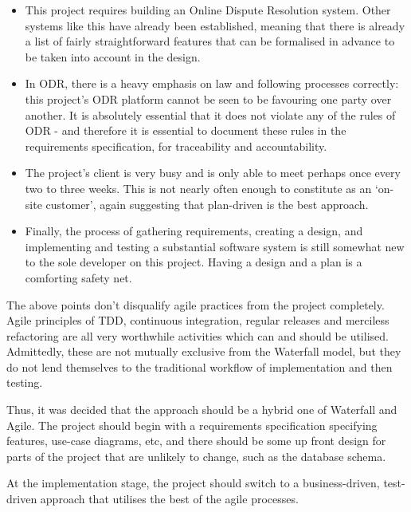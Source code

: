 \begin{itemize}

    \item This project requires building an Online Dispute Resolution system. Other systems like this have already been established, meaning that there is already a list of fairly straightforward features that can be formalised in advance to be taken into account in the design.
    
    \item In ODR, there is a heavy emphasis on law and following processes correctly: this project's ODR platform cannot be seen to be favouring one party over another. It is absolutely essential that it does not violate any of the rules of ODR - and therefore it is essential to document these rules in the requirements specification, for traceability and accountability.
    
    \item The project's client is very busy and is only able to meet perhaps once every two to three weeks. This is not nearly often enough to constitute as an `on-site customer', again suggesting that plan-driven is the best approach.
    
    \item Finally, the process of gathering requirements, creating a design, and implementing and testing a substantial software system is still somewhat new to the sole developer on this project. Having a design and a plan is a comforting safety net.

\end{itemize}

The above points don't disqualify agile practices from the project completely. Agile principles of TDD, continuous integration, regular releases and merciless refactoring are all very worthwhile activities which can and should be utilised. Admittedly, these are not mutually exclusive from the Waterfall model, but they do not lend themselves to the traditional workflow of implementation and then testing.

Thus, it was decided that the approach should be a hybrid one of Waterfall and Agile. The project should begin with a requirements specification specifying features, use-case diagrams, etc, and there should be some up front design for parts of the project that are unlikely to change, such as the database schema.

At the implementation stage, the project should switch to a business-driven, test-driven approach that utilises the best of the agile processes.

